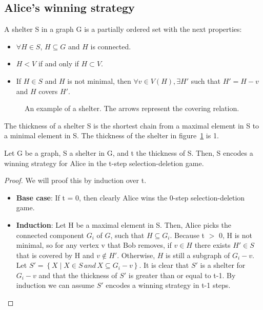 \subsection{Alice's winning strategy}
\begin{definition}
A shelter S in a graph G is a partially ordered set with the next properties:
\begin{itemize}
  \item $\forall H \in S$, $H \subseteq G$ and $H$ is connected.
  \item $H < V$ if and only if $H \subset V$.
  \item If $H \in S$ and $H$ is not minimal, then $\forall v \in V(H), \exists H'$ such that $H' = H - v$ and $H$ covers $H'$.
\end{itemize}
\end{definition}

\begin{figure}[H]

\caption{An example of a shelter. The arrows represent the covering relation. \label{fig:shelter-example}}
\end{figure}
The thickness of a shelter S is the shortest chain from a maximal element in S to a minimal element in S. The thickness of the shelter in figure~\ref{fig:shelter-example} is 1.
\begin{lemma}
Let G be a graph, S a shelter in G, and t the thickness of S. Then, S encodes a winning strategy for Alice in the t-step selection-deletion game.
\end{lemma}
\begin{proof}
We will proof this by induction over t.
\begin{itemize}
  \item \textbf{Base case}: If t = 0, then clearly Alice wins the 0-step selection-deletion game.
  \item \textbf{Induction}: Let H be a maximal element in S. Then, Alice picks the connected component $G_i$ of $G$, such that $H \subseteq G_i$. Because t $>$ 0, H is not minimal, so for any vertex v that Bob removes, if $v \in H$ there exists $H' \in S$ that is covered by H and $v \notin H'$. Otherwise, $H$ is still a subgraph of $G_i - v$. Let $S' =\left\{X \mid X \in S \, and \, X \subseteq G_i - v\right\}$. It is clear that $S'$ is a shelter for $G_i - v$ and that the thickness of $S'$ is greater than or equal to t-1. By induction we can assume $S'$ encodes a winning strategy in t-1 steps.
\end{itemize}
\end{proof}
